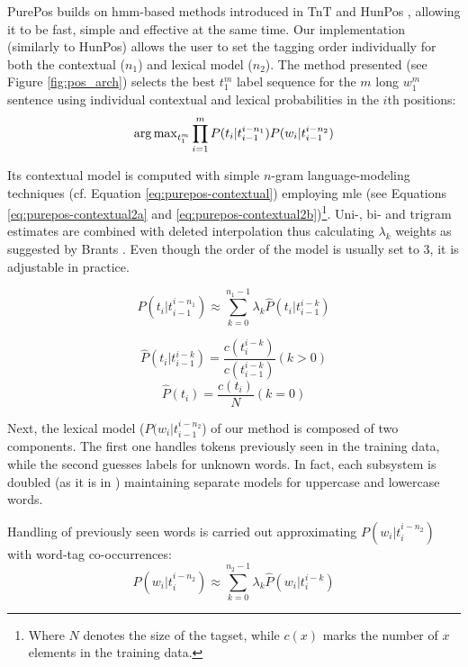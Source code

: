 PurePos builds on \acrshort{hmm}-based methods \cite{Rabiner1989,Samuelsson1993} introduced in TnT \cite{Brants2000} and HunPos \cite{Halacsy2007}, allowing it to be fast, simple and effective at the same time. 
Our implementation (similarly to HunPos) allows the user to set the tagging order individually for both the contextual ($n_1$) and lexical model ($n_2$).
The method presented (see Figure \ref{fig:pos_arch}) selects the best $t_1^m$ label sequence for the $m$ long $w_1^m$ sentence using individual contextual and lexical probabilities in the $i$th positions:
\begin{equation}
\operatorname{arg\,max}_{t_1^m} \prod_{i=1}^m P(t_i | t_{i-1}^{i-n_1}) P(w_i|t_{i-1}^{i-n_2})
\end{equation}

Its contextual model is computed with simple $n$-gram language-modeling techniques (cf. Equation \ref{eq:purepos-contextual}) employing \gls{mle} (see Equations \ref{eq:purepos-contextual2a} and \ref{eq:purepos-contextual2b})\footnote{Where $N$ denotes the size of the tagset, while $c(x)$ marks the number of $x$ elements in the training data.}. 
Uni-, bi- and trigram estimates are combined with deleted interpolation thus calculating $\lambda_k$ weights as suggested by Brants \cite{Brants2000}. Even though the order of the model is usually set to 3, it is adjustable in practice. 


\begin{equation}\label{eq:purepos-contextual}
P(t_i | t_{i-1}^{i-n_1}) \approx \sum_{k=0}^{n_1-1} \lambda_k \hat{P}(t_i|t_{i-1}^{i-k})
\end{equation}

\begin{equation}\label{eq:purepos-contextual2a}
\hat{P}(t_i|t_{i-1}^{i-k}) = \frac{c(t^{i-k}_i)}{c(t_{i-1}^{i-k})} (k>0) 
\end{equation}
\begin{equation}\label{eq:purepos-contextual2b}
\hat{P}(t_i) = \frac{c(t_i)}{N} (k=0)
\end{equation}

Next, the lexical model ($P(w_i|t_{i-1}^{i-n_2}$) of our method is composed of two components. 
The first one handles tokens previously seen in the training data, while the second guesses labels for unknown words. 
In fact, each subsystem is doubled (as it is in \cite{Brants2000,Halacsy2007}) maintaining separate models for uppercase and lowercase words. 

Handling of previously seen words is carried out approximating $P(w_i | t_{i}^{i-n_2})$ with word-tag co-occurrences: 
\begin{equation} \label{eq:purepos-lexical}
P(w_i | t_{i}^{i-n_2}) \approx  \sum_{k=0}^{n_2-1} \lambda_k \hat{P}(w_i|t_{i}^{i-k})
\end{equation}

